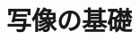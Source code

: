 \documentclass[../../topic_linear-algebra]{subfiles}
\begin{document}
\chapter{写像の基礎}
\end{document}
